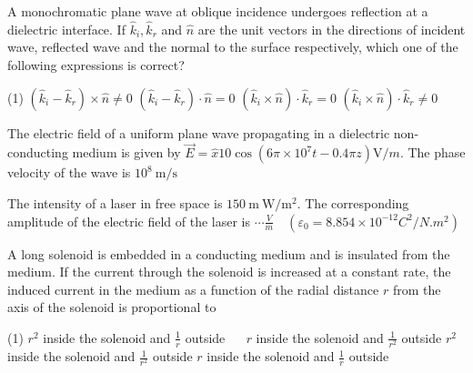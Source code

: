 \begin{enumerate}
\begin{minipage}{\textwidth}
	\item A monochromatic plane wave at oblique incidence undergoes reflection at a dielectric interface. If $\hat{k}_{i}, \hat{k}_{r}$ and $\hat{n}$ are the unit vectors in the directions of incident wave, reflected wave and the normal to the surface respectively, which one of the following expressions is correct?
\end{minipage}
\begin{tasks}(1)
	\task[\textbf{A.}] $\left(\hat{k}_{i}-\hat{k}_{r}\right) \times \hat{n} \neq 0$
	\task[\textbf{B.}]$\left(\hat{k}_{i}-\hat{k}_{r}\right) \cdot \hat{n}=0$
	\task[\textbf{C.}]$\left(\hat{k}_{i} \times \hat{n}\right) \cdot \hat{k}_{r}=0$
	\task[\textbf{D.}]$\left(\hat{k}_{i} \times \hat{n}\right) \cdot \hat{k}_{r} \neq 0$
\end{tasks}
\begin{minipage}{\textwidth}
	\item The electric field of a uniform plane wave propagating in a dielectric non-conducting medium is given by $\vec{E}=\hat{x} 10 \cos \left(6 \pi \times 10^{7} t-0.4 \pi z\right) \mathrm{V} / m$. The phase velocity of the wave is $10^{8} \mathrm{~m} / \mathrm{s}$ 
\end{minipage}
\begin{minipage}{\textwidth}
	\item The intensity of a laser in free space is $150 \mathrm{~m} \mathrm{~W} / \mathrm{m}^{2}$. The corresponding amplitude of the electric field of the laser is $\cdots\frac{V}{m} \quad\left(\varepsilon_{0}=8.854 \times 10^{-12} C^{2} / N . m^{2}\right)$
\end{minipage}
\begin{minipage}{\textwidth}
	\item A long solenoid is embedded in a conducting medium and is insulated from the medium. If the current through the solenoid is increased at a constant rate, the induced current in the medium as a function of the radial distance $r$ from the axis of the solenoid is proportional to
\end{minipage}
\begin{tasks}(1)
	\task[\textbf{A.}] $r^{2}$ inside the solenoid and $\frac{1}{r}$ outside $\quad$  
	\task[\textbf{B.}]$r$ inside the solenoid and $\frac{1}{r^{2}}$ outside
	\task[\textbf{C.}] $r^{2}$ inside the solenoid and $\frac{1}{r^{2}}$ outside
	\task[\textbf{D.}]$r$ inside the solenoid and $\frac{1}{r}$ outside
\end{tasks}

\end{enumerate}
